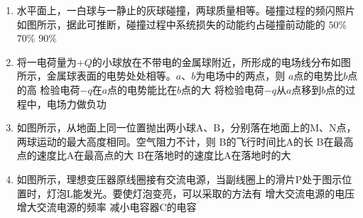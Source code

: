 \documentclass[\gkver]{gaokaozhenti}
\begin{document}
\begin{enumerate}
{可用\textbf{极限法}分析$U$增大灵敏度和什么因素有关：假设$R$很小，甚至为零，则传感器部分的电路被短路，故传感器$R_{M}$的大小变化对S的电压就无影响，而$R$越大，甚至接近于断路，那么传感器的变化就直接影响了S的电压的变化。所以，$R$越大，$U$增大越明显。

正确选项为C。
}

\item
水平面上，一白球与一静止的灰球碰撞，两球质量相等。碰撞过程的频闪照片如图所示，据此可推断，碰撞过程中系统损失的动能约占碰撞前动能的
{$50\%$}
{$70\%$}
{$90\%$}

\item
将一电荷量为$+Q$的小球放在不带电的金属球附近，所形成的电场线分布如图所示，金属球表面的电势处处相等。$a$、$b$为电场中的两点，则
{$a$点的电势比$b$点的高}
{检验电荷$-q$在$a$点的电势能比在$b$点的大}
{将检验电荷$-q$从$a$点移到$b$点的过程中，电场力做负功}

\item
如图所示，从地面上同一位置抛出两小球A、B，分别落在地面上的M、N点，两球运动的最大高度相同。空气阻力不计，则
{B的飞行时间比A的长}
{B在最高点的速度比A在最高点的大}
{B在落地时的速度比A在落地时的大}

\item
如图所示，理想变压器原线圈接有交流电源，当副线圈上的滑片P处于图示位置时，灯泡L能发光。要使灯泡变亮，可以采取的方法有
{增大交流电源的电压}
{增大交流电源的频率}
{减小电容器C的电容}


\end{enumerate}
\end{document}
